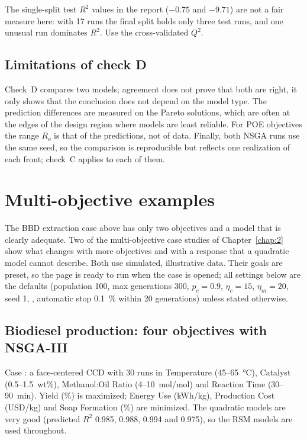 The single-split test $R^2$ values in the report ($-0.75$ and $-9.71$) are not a fair measure here: with 17 runs
the final split holds only three test runs, and one unusual run dominates $R^2$. Use the cross-validated $Q^2$.

\subsection{Limitations of check D}
Check~D compares two models; agreement does not prove that both are right, it only shows that the conclusion does not
depend on the model type. The prediction differences are measured on the Pareto solutions, which are often at the
edges of the design region where models are least reliable. For POE objectives the range $R_o$ is that of the
predictions, not of data. Finally, both NSGA runs use the same seed, so the comparison is reproducible but reflects one
realization of each front; check~C applies to each of them.

\section{Multi-objective examples}
\label{sec:ch08-moo-examples}
The BBD extraction case above has only two objectives and a model that is clearly adequate. Two of the
multi-objective case studies of Chapter~\ref{chap:2} show what changes with more objectives and with a response that a
quadratic model cannot describe. Both use simulated, illustrative data. Their goals are preset, so the
 page is ready to run when the case is opened; all settings below are the defaults (population 100,
max generations 300, $p_c=0.9$, $\eta_c=15$, $\eta_m=20$, seed 1, , automatic stop 0.1~\% within 20
generations) unless stated otherwise.

\subsection{Biodiesel production: four objectives with NSGA-III}
\label{sec:ch08-biodiesel}
Case : a face-centered CCD with 30 runs in Temperature (45--65~°C), Catalyst
(0.5--1.5~wt\%), Methanol:Oil Ratio (4--10~mol/mol) and Reaction Time (30--90~min). Yield (\%) is maximized; Energy Use
(kWh/kg), Production Cost (USD/kg) and Soap Formation (\%) are minimized. The quadratic models are very good (predicted
$R^2$ 0.985, 0.988, 0.994 and 0.975), so the RSM models are used throughout.

